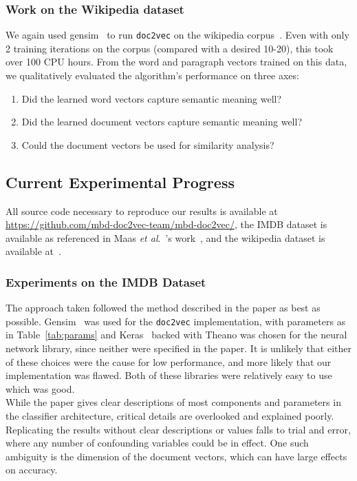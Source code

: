 \documentclass[11pt]{article}
\def\etal{\emph{et al}.\ }
\begin{document}
  \subsubsection*{Work on the Wikipedia dataset}
    We again used gensim~\cite{gensim} to run \texttt{doc2vec} on the wikipedia
    corpus~\cite{wikidatadump2016}. Even with only 2 training iterations on the
    corpus (compared with a desired 10-20), this took over 100 CPU hours.
    From the word and paragraph vectors trained on this data, we
    qualitatively evaluated the algorithm's performance on three axes:
    \begin{enumerate}
      \item Did the learned word vectors capture semantic meaning well?
      \item Did the learned document vectors capture semantic meaning well?
      \item Could the document vectors be used for similarity analysis?
    \end{enumerate}

\subsection*{Current Experimental Progress}
  All source code necessary to reproduce our results is available at
  \url{https://github.com/mbd-doc2vec-team/mbd-doc2vec/}, the IMDB dataset is
  available as referenced in Maas \etal's work~\cite{maas2011}, and the wikipedia
  dataset is available at~\cite{wikidatadump2016}.
  \subsubsection*{Experiments on the IMDB Dataset}
    The approach taken followed the method described in the paper as best as possible.
    Gensim~\cite{gensim} was used for the \texttt{doc2vec} implementation, with parameters as
    in Table~\ref{tab:params} and Keras~\cite{keras} backed with Theano was chosen for
    the neural network library, since neither were specified in the paper. It is unlikely
    that either of these choices were the cause for low performance, and more likely
    that our implementation was flawed. Both of these libraries were relatively easy
    to use which was good.\\
    While the paper gives clear descriptions of most components and parameters in the
    classifier architecture, critical details are overlooked and explained poorly.
    Replicating the results without clear descriptions or values falls to trial and
    error, where any number of confounding variables could be in effect.
    One such ambiguity is the dimension of the document vectors, which can have
    large effects on accuracy.
\end{document}
